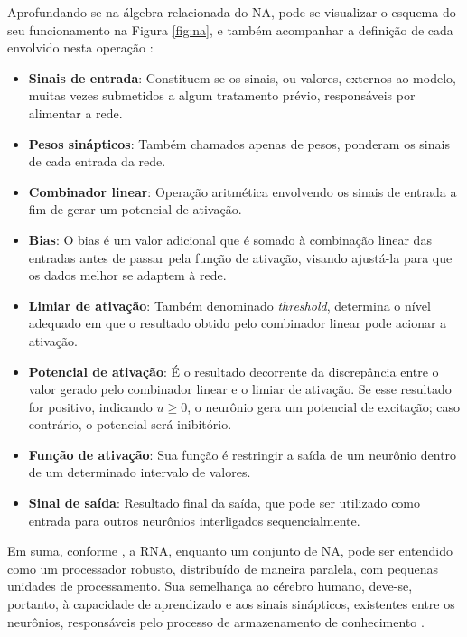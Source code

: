 Aprofundando-se na álgebra relacionada do NA, pode-se visualizar o esquema do seu funcionamento na Figura \ref{fig:na}, e também acompanhar a definição de cada envolvido nesta operação \cite{deeplearningbook2023}:

\begin{itemize}
    \item \textbf{Sinais de entrada}: Constituem-se os sinais, ou valores, externos ao modelo, muitas vezes submetidos a algum tratamento prévio, responsáveis por alimentar a rede.
    \item \textbf{Pesos sinápticos}: Também chamados apenas de pesos, ponderam os sinais de cada entrada da rede.
    \item \textbf{Combinador linear}: Operação aritmética envolvendo os sinais de entrada a fim de gerar um potencial de ativação.
    \item \textbf{Bias}: O bias é um valor adicional que é somado à combinação linear das entradas antes de passar pela função de ativação, visando ajustá-la para que os dados melhor se adaptem à rede.
    \item \textbf{Limiar de ativação}: Também denominado \textit{threshold}, determina o nível adequado em que o resultado obtido pelo combinador linear pode acionar a ativação.
    \item \textbf{Potencial de ativação}: É o resultado decorrente da discrepância entre o valor gerado pelo combinador linear e o limiar de ativação. Se esse resultado for positivo, indicando \(u \geq 0\), o neurônio gera um potencial de excitação; caso contrário, o potencial será inibitório.
    \item \textbf{Função de ativação}: Sua função é restringir a saída de um neurônio dentro de um determinado intervalo de valores.
    \item \textbf{Sinal de saída}: Resultado final da saída, que pode ser utilizado como entrada para outros neurônios interligados sequencialmente.
  \end{itemize}  

  Em suma, conforme \cite{goodfellow2016deep}, a RNA, enquanto um conjunto de NA, pode ser entendido como um processador robusto, distribuído de maneira paralela, com pequenas unidades de processamento. Sua semelhança ao cérebro humano, deve-se, portanto, à capacidade de aprendizado e aos sinais sinápticos, existentes entre os neurônios, responsáveis pelo processo de armazenamento de conhecimento \cite{haykin2001redes}.
	
